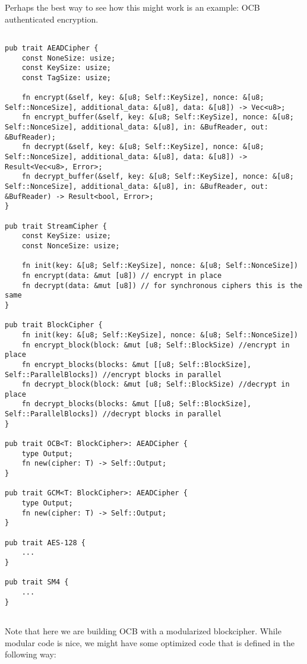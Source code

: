 \documentclass[letterpaper,11pt]{article}
\begin{document}
Perhaps the best way to see how this might work is an example:  OCB authenticated encryption.

\begin{verbatim}

pub trait AEADCipher {
    const NoneSize: usize;
    const KeySize: usize;
    const TagSize: usize;
    
    fn encrypt(&self, key: &[u8; Self::KeySize], nonce: &[u8; Self::NonceSize], additional_data: &[u8], data: &[u8]) -> Vec<u8>;
    fn encrypt_buffer(&self, key: &[u8; Self::KeySize], nonce: &[u8; Self::NonceSize], additional_data: &[u8], in: &BufReader, out: &BufReader);
    fn decrypt(&self, key: &[u8; Self::KeySize], nonce: &[u8; Self::NonceSize], additional_data: &[u8], data: &[u8]) -> Result<Vec<u8>, Error>;
    fn decrypt_buffer(&self, key: &[u8; Self::KeySize], nonce: &[u8; Self::NonceSize], additional_data: &[u8], in: &BufReader, out: &BufReader) -> Result<bool, Error>;
}

pub trait StreamCipher {
    const KeySize: usize;
    const NonceSize: usize;

    fn init(key: &[u8; Self::KeySize], nonce: &[u8; Self::NonceSize])
    fn encrypt(data: &mut [u8]) // encrypt in place
    fn decrypt(data: &mut [u8]) // for synchronous ciphers this is the same 
}

pub trait BlockCipher {
    fn init(key: &[u8; Self::KeySize], nonce: &[u8; Self::NonceSize])
    fn encrypt_block(block: &mut [u8; Self::BlockSize) //encrypt in place
    fn encrypt_blocks(blocks: &mut [[u8; Self::BlockSize], Self::ParallelBlocks]) //encrypt blocks in parallel
    fn decrypt_block(block: &mut [u8; Self::BlockSize) //decrypt in place
    fn decrypt_blocks(blocks: &mut [[u8; Self::BlockSize], Self::ParallelBlocks]) //decrypt blocks in parallel
}

pub trait OCB<T: BlockCipher>: AEADCipher {
    type Output;
    fn new(cipher: T) -> Self::Output;
}

pub trait GCM<T: BlockCipher>: AEADCipher {
    type Output;
    fn new(cipher: T) -> Self::Output;
}

pub trait AES-128 {
    ...
}

pub trait SM4 {
    ...
}


\end{verbatim}

Note that here we are building OCB with a modularized blockcipher.  While modular code is nice, we might have some optimized code that is defined in the following way:
\end{document}
